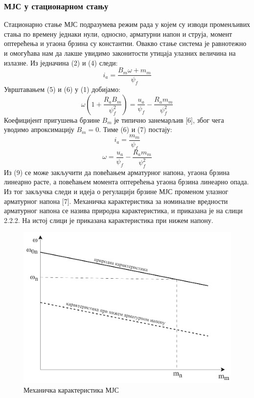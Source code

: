 \documentclass[12pt]{article}
\begin{document}
\subsubsection{МЈС у стационарном стању}
Стационарно стање МЈС подразумева режим рада у којем су изводи променљивих стања по времену једнаки нули, односно, арматурни напон и струја, момент оптерећења и угаона брзина су константни. Овакво стање система је равнотежно и омогућава нам да лакше увидимо законитости утицаја улазних величина на излазне. Из једначина (2) и (4) следи:
\begin{equation}
    i_a=\dfrac{B_m\omega+m_m}{\psi _f}
\end{equation}
Уврштавањем (5) и (6) у (1) добијамо:
\begin{equation}
    \omega(1+\dfrac{R_aB_m}{\psi _f^2})=\dfrac{u_a}{\psi _f}-\dfrac{R_am_m}{\psi _f^2}
\end{equation}
Коефицијент пригушења брзине $B_m$ је типично занемарљив [6], због чега уводимо апроксимацију $B_m=0$. Тиме (6) и (7) постају:
\begin{equation}
    i_a=\dfrac{m_m}{\psi _f}
\end{equation}
\begin{equation}
    \omega=\dfrac{u_a}{\psi _f}-\dfrac{R_am_m}{\psi _f^2}
\end{equation}
Из (9) се може закључити да повећањем арматурног напона, угаона брзина линеарно расте, а повећањем момента оптерећења угаона брзина линеарно опада. Из тог закључка следи и идеја о регулацији брзине МЈС променом улазног арматурног напона [7]. Механичка карактеристика за номиналне вредности арматурног напона се назива природна карактеристика, и приказана је на слици 2.2.2. На истој слици је приказана карактеристика при нижем напону.

\begin{figure}[H]
    \centering
    \includegraphics[width=15cm]{figures/k-ka_bdc.drawio.png}
    \caption{Механичка карактеристика МЈС}
    \label{fig:карактеристика_мјс}
\end{figure}
\end{document}
